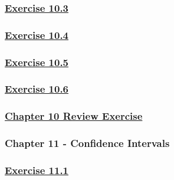 \documentclass[
  11pt,
]{book}
\begin{document}
\subsubsection*{\texorpdfstring{\hyperref[ex103q]{Exercise 10.3}}{Exercise 10.3}}\label{exercise-10.3-1}

\subsubsection*{\texorpdfstring{\hyperref[ex104q]{Exercise 10.4}}{Exercise 10.4}}\label{exercise-10.4-1}

\subsubsection*{\texorpdfstring{\hyperref[ex105q]{Exercise 10.5}}{Exercise 10.5}}\label{exercise-10.5-1}

\subsubsection*{\texorpdfstring{\hyperref[ex106q]{Exercise 10.6}}{Exercise 10.6}}\label{exercise-10.6-1}

\subsubsection*{\texorpdfstring{\hyperref[re10q]{Chapter 10 Review Exercise}}{Chapter 10 Review Exercise}}\label{chapter-10-review-exercise}

\subsubsection*{Chapter 11 - Confidence Intervals}\label{chapter-11---confidence-intervals}

\subsubsection*{\texorpdfstring{\hyperref[ex111q]{Exercise 11.1}}{Exercise 11.1}}\label{exercise-11.1-1}
\end{document}

